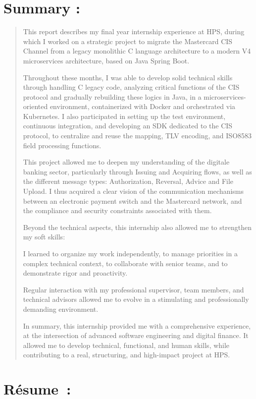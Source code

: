 \documentclass[12pt,a4paper]{report}
\begin{document}
\hypertarget{summary}{%
\section{\texorpdfstring{\textbf{Summary :}}{Summary :}}\label{summary}}

\begin{quote}
This report describes my final year internship experience at HPS, during
which I worked on a strategic project to migrate the Mastercard CIS
Channel from a legacy monolithic C language architecture to a modern V4
microservices architecture, based on Java Spring Boot.

Throughout these months, I was able to develop solid technical skills
through handling C legacy code, analyzing critical functions of the CIS
protocol and gradually rebuilding these logics in Java, in a
microservices-oriented environment, containerized with Docker and
orchestrated via Kubernetes. I also participated in setting up the test
environment, continuous integration, and developing an SDK dedicated to
the CIS protocol, to centralize and reuse the mapping, TLV encoding, and
ISO8583 field processing functions.

This project allowed me to deepen my understanding of the digitale
banking sector, particularly through Issuing and Acquiring flows, as
well as the different message types: Authorization, Reversal, Advice and
File Upload. I thus acquired a clear vision of the communication
mechanisms between an electronic payment switch and the Mastercard
network, and the compliance and security constraints associated with
them.

Beyond the technical aspects, this internship also allowed me to
strengthen my soft skills:

I learned to organize my work independently, to manage priorities in a
complex technical context, to collaborate with senior teams, and to
demonstrate rigor and proactivity.

Regular interaction with my professional supervisor, team members, and
technical advisors allowed me to evolve in a stimulating and
professionally demanding environment.

In summary, this internship provided me with a comprehensive experience,
at the intersection of advanced software engineering and digital
finance. It allowed me to develop technical, functional, and human
skills, while contributing to a real, structuring, and high-impact
project at HPS.
\end{quote}
\clearpage
\hypertarget{ruxe9sume}{%
\section{\texorpdfstring{\textbf{Résume~:}}{Résume~:}}\label{ruxe9sume}}
\end{document}
